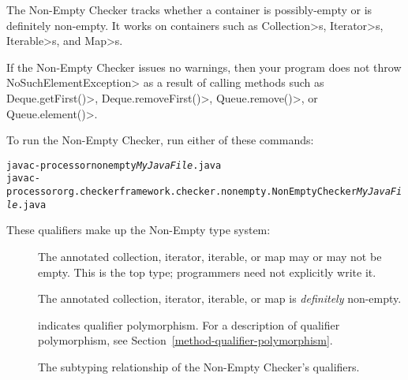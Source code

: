 \htmlhr
{}

The Non-Empty Checker tracks whether a container is possibly-empty or is
definitely non-empty.  It works on containers such as
\<Collection>s, \<Iterator>s, \<Iterable>s, and \<Map>s.

If the Non-Empty Checker issues no warnings, then your program does not
throw \<NoSuchElementException> as a result of calling methods such as
\<Deque.getFirst()>, \<Deque.removeFirst()>, \<Queue.remove()>, or
\<Queue.element()>.

To run the Non-Empty Checker, run either of these commands:

\begin{alltt}
  javac -processor nonempty \emph{MyJavaFile}.java
  javac -processor org.checkerframework.checker.nonempty.NonEmptyChecker \emph{MyJavaFile}.java
\end{alltt}


These qualifiers make up the Non-Empty type system:

\begin{description}

\item[]
  The annotated collection, iterator, iterable, or map may or may not be empty.
  This is the top type; programmers need not explicitly write it.

\item[]
  The annotated collection, iterator, iterable, or map is \emph{definitely}
  non-empty.

\item[]
  indicates qualifier polymorphism.
  For a description of qualifier polymorphism, see
  Section~\ref{method-qualifier-polymorphism}.

\end{description}

\begin{figure}
\caption{The subtyping relationship of the Non-Empty Checker's qualifiers.}
\label{fig-nonempty-hierarchy}
\end{figure}


